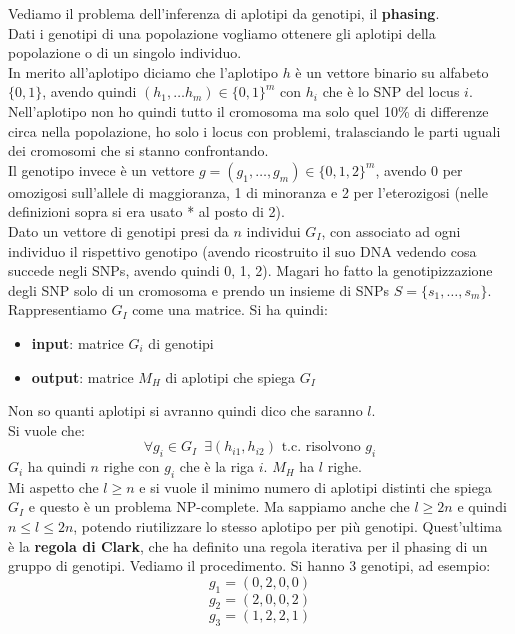 \documentclass[a4paper,12pt, oneside]{book}
\begin{document}
\begin{esempio}
  Vediamo il problema dell'inferenza di aplotipi da genotipi, il
  \textbf{phasing}.\\ 
  Dati i genotipi di una popolazione vogliamo ottenere gli aplotipi della
  popolazione o di un singolo individuo.\\
  In merito all'aplotipo diciamo che l'aplotipo $h$ è un vettore binario
  su alfabeto $\{0,1\}$, avendo quindi $(h_1,\ldots h_m)\in\{0,1\}^m$ con $h_i$
  che è lo SNP del locus $i$. Nell'aplotipo non ho quindi tutto il cromosoma ma
  solo quel 10\% di differenze circa nella popolazione, ho solo i locus con
  problemi, tralasciando le parti uguali dei cromosomi che si stanno
  confrontando. \\
  Il genotipo invece è un vettore $g=(g_1,\ldots,g_m)\in \{0,1,2\}^m$, avendo 0
  per omozigosi sull'allele di maggioranza, 1 di minoranza e 2 per
  l'eterozigosi (nelle definizioni sopra si era usato * al posto di 2). \\
  Dato un vettore di genotipi presi da $n$ individui $G_I$, con associato ad
  ogni individuo il rispettivo genotipo (avendo ricostruito il suo DNA vedendo
  cosa succede negli SNPs, avendo quindi 0, 1, 2). Magari ho fatto la
  genotipizzazione degli SNP solo di un cromosoma e prendo un insieme di SNPs
  $S=\{s_1,\ldots,s_m\}$. \\
  Rappresentiamo $G_I$ come una matrice. Si ha quindi:
  \begin{itemize}
    \item \textbf{input}: matrice $G_i$ di genotipi
    \item \textbf{output}: matrice $M_H$ di aplotipi che spiega $G_I$
  \end{itemize}
  Non so quanti aplotipi si avranno quindi dico che saranno $l$. \\
  Si vuole che:
  \[\forall g_i\in G_I\,\,\,\exists (h_{i1},h_{i2})\mbox{ t.c. risolvono } g_i\]
  $G_i$ ha quindi $n$ righe con $g_i$ che è la riga $i$. $M_H$ ha $l$ righe. \\
  Mi aspetto che $l\geq n$ e si vuole il minimo numero di aplotipi distinti che
  spiega $G_I$ e questo è un problema NP-complete. Ma sappiamo anche che $l\geq
  2n$ e quindi $n\leq l \leq 2n$, potendo riutilizzare lo stesso aplotipo per
  più genotipi. Quest'ultima è la \textbf{regola di Clark}, che ha definito una
  regola iterativa per il phasing di un gruppo di genotipi. Vediamo il
  procedimento. Si hanno 3 genotipi, ad esempio:
  \[g_1=(0,2,0,0)\]
  \[g_2=(2,0,0,2)\]
  \[g_3=(1,2,2,1)\]

\end{esempio}
\end{document}
